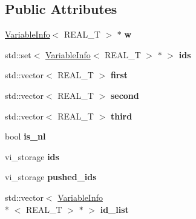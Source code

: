 \subsection*{Public Attributes}
\begin{DoxyCompactItemize}
\item 
\hypertarget{structatl_1_1_stack_entry_a030b94a3c6f50f8ea60126deca7c6cc7}{\hyperlink{structatl_1_1_variable_info}{Variable\+Info}$<$ R\+E\+A\+L\+\_\+\+T $>$ $\ast$ {\bfseries w}}\label{structatl_1_1_stack_entry_a030b94a3c6f50f8ea60126deca7c6cc7}

\item 
\hypertarget{structatl_1_1_stack_entry_a6c7e421af4df1bba1ce5031eec6049b8}{std\+::set$<$ \hyperlink{structatl_1_1_variable_info}{Variable\+Info}$<$ R\+E\+A\+L\+\_\+\+T $>$ $\ast$ $>$ {\bfseries ids}}\label{structatl_1_1_stack_entry_a6c7e421af4df1bba1ce5031eec6049b8}

\item 
\hypertarget{structatl_1_1_stack_entry_ad3ff8babc7ef2524394b6367e8b99d50}{std\+::vector$<$ R\+E\+A\+L\+\_\+\+T $>$ {\bfseries first}}\label{structatl_1_1_stack_entry_ad3ff8babc7ef2524394b6367e8b99d50}

\item 
\hypertarget{structatl_1_1_stack_entry_a5f71d407983c8818ea4baf94113ca4d6}{std\+::vector$<$ R\+E\+A\+L\+\_\+\+T $>$ {\bfseries second}}\label{structatl_1_1_stack_entry_a5f71d407983c8818ea4baf94113ca4d6}

\item 
\hypertarget{structatl_1_1_stack_entry_a5003b4571917fc9ba489b618146fdc03}{std\+::vector$<$ R\+E\+A\+L\+\_\+\+T $>$ {\bfseries third}}\label{structatl_1_1_stack_entry_a5003b4571917fc9ba489b618146fdc03}

\item 
\hypertarget{structatl_1_1_stack_entry_ad787906516faf9b0560e9a05ad498002}{bool {\bfseries is\+\_\+nl}}\label{structatl_1_1_stack_entry_ad787906516faf9b0560e9a05ad498002}

\item 
\hypertarget{structatl_1_1_stack_entry_a4a62fa58ea18326679a6ad6eb3204dbc}{vi\+\_\+storage {\bfseries ids}}\label{structatl_1_1_stack_entry_a4a62fa58ea18326679a6ad6eb3204dbc}

\item 
\hypertarget{structatl_1_1_stack_entry_a73c36c099806680fc64ed05a3ab2e087}{vi\+\_\+storage {\bfseries pushed\+\_\+ids}}\label{structatl_1_1_stack_entry_a73c36c099806680fc64ed05a3ab2e087}

\item 
\hypertarget{structatl_1_1_stack_entry_a756881e857efb10407762e29c5953c44}{std\+::vector$<$ \hyperlink{structatl_1_1_variable_info}{Variable\+Info}\\*
$<$ R\+E\+A\+L\+\_\+\+T $>$ $\ast$ $>$ {\bfseries id\+\_\+list}}\label{structatl_1_1_stack_entry_a756881e857efb10407762e29c5953c44}

\end{DoxyCompactItemize}


